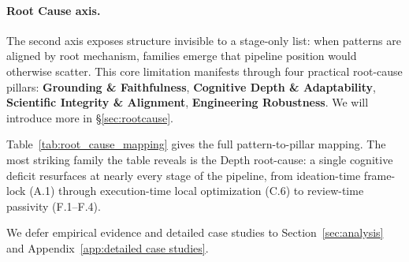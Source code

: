 \paragraph{Root Cause axis.}
The second axis exposes structure invisible to a stage-only list: when patterns are aligned by root mechanism, families emerge that pipeline position would otherwise scatter. This core limitation manifests through four practical root-cause pillars: \textbf{Grounding \& Faithfulness}, \textbf{Cognitive Depth \& Adaptability}, \textbf{Scientific Integrity \& Alignment}, \textbf{Engineering Robustness}. We will introduce more in \S\ref{sec:rootcause}.
 
Table~\ref{tab:root_cause_mapping} gives the full pattern-to-pillar mapping. The most striking family the table reveals is the Depth root-cause: a single cognitive deficit resurfaces at nearly every stage of the pipeline, from ideation-time frame-lock (A.1) through execution-time local optimization (C.6) to review-time passivity (F.1--F.4).

 
 
\medskip
 

 
We defer empirical evidence and detailed case studies to Section~\ref{sec:analysis} and Appendix~\ref{app:detailed case studies}.



